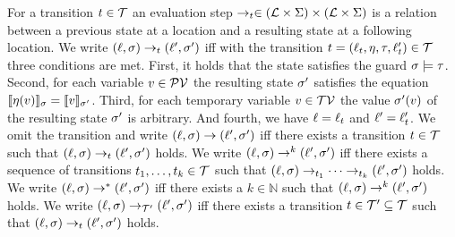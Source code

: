 \begin{definition}[Evaluation] 
  For a transition $t \in \mathcal{T}$ an evaluation step $\rightarrow_t \in (\mathcal{L} \times \Sigma) \times (\mathcal{L} \times \Sigma)$ is a relation between a previous state at a location and a resulting state at a following location.
  We write $(\ell, \sigma) \rightarrow_t (\ell', \sigma')$ iff with the transition $t = (\ell_t, \eta, \tau, \ell_t') \in \mathcal{T}$ three conditions are met.
  First, it holds that the state satisfies the guard $\sigma \models \tau$.
  Second, for each variable $v \in \mathcal{PV}$ the resulting state $\sigma'$ satisfies the equation $\llbracket \eta(v) \rrbracket_{\sigma} = \llbracket v \rrbracket_{\sigma'}$.
  Third, for each temporary variable $v \in \mathcal{TV}$ the value $\sigma'(v)$ of the resulting state $\sigma'$ is arbitrary.
  And fourth, we have $\ell = \ell_t$ and $\ell' = \ell_t'$.
  We omit the transition and write $(\ell, \sigma) \rightarrow (\ell', \sigma')$ iff there exists a transition $t \in \mathcal{T}$ such that $(\ell, \sigma) \rightarrow_t (\ell', \sigma')$ holds.
  We write $(\ell, \sigma) \rightarrow^k (\ell', \sigma')$ iff there exists a sequence of transitions $t_1, \dots, t_k \in \mathcal{T}$ such that $(\ell, \sigma) \rightarrow_{t_1} \dots \rightarrow_{t_k} (\ell', \sigma')$ holds.
  We write $(\ell, \sigma) \rightarrow^* (\ell', \sigma')$ iff there exists a $k \in \mathbb{N}$ such that $(\ell, \sigma) \rightarrow^k (\ell', \sigma')$ holds.
  We write $(\ell, \sigma) \rightarrow_{\mathcal{T}'} (\ell', \sigma')$ iff there exists a transition $t \in \mathcal{T}' \subseteq \mathcal{T}$ such that $(\ell, \sigma) \rightarrow_t (\ell', \sigma')$ holds.
\end{definition}
